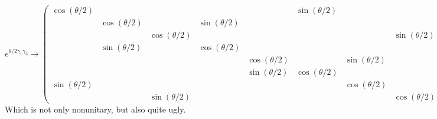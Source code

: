 \documentclass[12 pt]{article}
\begin{document}
\[  e^{\theta/2 \gamma_1 \gamma_3} \to  \left( \begin{array} {cccccccc}     \cos(\theta/2) & & & & &\sin(\theta/2)  & & \\ &\cos(\theta/2) & &\sin(\theta/2)  & & & & \\ & &\cos(\theta/2) & & & & & \sin(\theta/2) \\ & \sin(\theta/2)  & & \cos(\theta/2) &   & & & \\ & & & &\cos(\theta/2) & & \sin(\theta/2)  & \\ & & & & \sin(\theta/2)  &\cos(\theta/2) & & \\ \sin(\theta/2)  & & & & & &\cos(\theta/2) & \\ &  & \sin(\theta/2)  & & & & &\cos(\theta/2)   \end{array} \right)   \]
Which is not only nonunitary, but also quite ugly.
\end{document}
